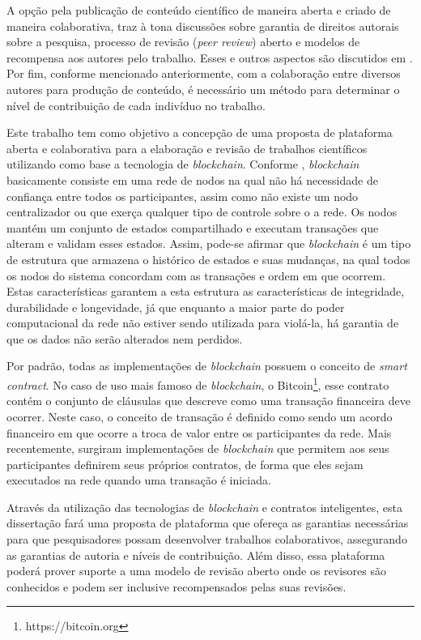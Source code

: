 A opção pela publicação de conteúdo científico de maneira aberta e criado de maneira colaborativa, traz à tona discussões sobre garantia de direitos autorais sobre a pesquisa, processo de revisão (\textit{peer review}) aberto e modelos de recompensa aos autores pelo trabalho. Esses e outros aspectos são discutidos em \cite{OpenAccessAnalysis2004}. Por fim, conforme mencionado anteriormente, com a colaboração entre diversos autores para produção de conteúdo, é necessário um método para determinar o nível de contribuição de cada indivíduo no trabalho.

Este trabalho tem como objetivo a concepção de uma proposta de plataforma aberta e colaborativa para a elaboração e revisão de trabalhos científicos utilizando como base a tecnologia de \textit{blockchain}. Conforme \cite{UntanglingBlockchain2017},  \textit{blockchain} basicamente consiste em uma rede de nodos na qual não há necessidade de confiança entre todos os participantes, assim como não existe um nodo centralizador ou que exerça qualquer tipo de controle sobre o a rede. Os nodos mantém um conjunto de estados compartilhado e executam transações que alteram e validam esses estados. Assim, pode-se afirmar que \textit{blockchain} é um tipo de estrutura que armazena o histórico de estados e suas mudanças, na qual todos os nodos do sistema concordam com as transações e ordem em que ocorrem. Estas características garantem a esta estrutura as características de integridade, durabilidade e longevidade, já que enquanto a maior parte do poder computacional da rede não estiver sendo utilizada para violá-la, há garantia de que os dados não serão alterados nem perdidos\cite{Bitcoin2008}.

Por padrão, todas as implementações de \textit{blockchain} possuem o conceito de \textit{smart contract}\cite{SmartContract2017}. No caso de uso mais famoso de \textit{blockchain}, o Bitcoin\footnote{https://bitcoin.org}, esse contrato contém o conjunto de cláusulas que descreve como uma transação financeira deve ocorrer. Neste caso, o conceito de transação é definido como sendo um acordo financeiro em que ocorre a troca de valor entre os participantes da rede. Mais recentemente, surgiram implementações de \textit{blockchain} que permitem aos seus participantes definirem seus próprios contratos, de forma que eles sejam executados na rede quando uma transação é iniciada.

Através da utilização das tecnologias de \textit{blockchain} e contratos inteligentes, esta dissertação fará uma proposta de plataforma que ofereça as garantias necessárias para que pesquisadores possam desenvolver trabalhos colaborativos, assegurando as garantias de autoria e níveis de contribuição. Além disso, essa plataforma poderá prover suporte a uma modelo de revisão aberto onde os revisores são conhecidos e podem ser inclusive recompensados pelas suas revisões.